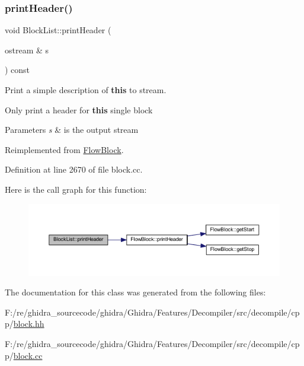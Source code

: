 \subsubsection{\texorpdfstring{printHeader()}{printHeader()}}
{\footnotesize\ttfamily void Block\+List\+::print\+Header (\begin{DoxyParamCaption}\item[{ostream \&}]{s }\end{DoxyParamCaption}) const\hspace{0.3cm}{\ttfamily [virtual]}}



Print a simple description of {\bfseries{this}} to stream. 

Only print a header for {\bfseries{this}} single block 
\begin{DoxyParams}{Parameters}
{\em s} & is the output stream \\
\hline
\end{DoxyParams}


Reimplemented from \mbox{\hyperlink{class_flow_block_a0d19c5b80186cf289dfbe0ce9e3ce37a}{Flow\+Block}}.



Definition at line 2670 of file block.\+cc.

Here is the call graph for this function\+:
\nopagebreak
\begin{figure}[H]
\begin{center}
\leavevmode
\includegraphics[width=350pt]{class_block_list_ac49227f39d0238f4d86c76a170cc009b_cgraph}
\end{center}
\end{figure}


The documentation for this class was generated from the following files\+:\begin{DoxyCompactItemize}
\item 
F\+:/re/ghidra\+\_\+sourcecode/ghidra/\+Ghidra/\+Features/\+Decompiler/src/decompile/cpp/\mbox{\hyperlink{block_8hh}{block.\+hh}}\item 
F\+:/re/ghidra\+\_\+sourcecode/ghidra/\+Ghidra/\+Features/\+Decompiler/src/decompile/cpp/\mbox{\hyperlink{block_8cc}{block.\+cc}}\end{DoxyCompactItemize}
